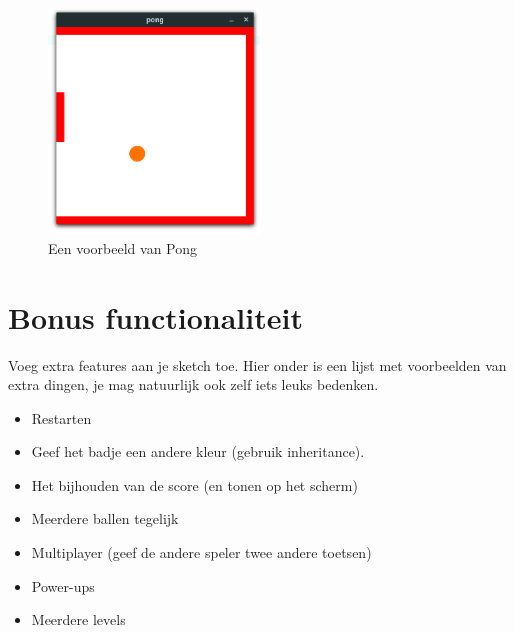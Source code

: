 \documentclass{../qh_assignment}
\begin{document}
\begin{figure}[H]
	\centering
	\includegraphics[width=0.5\textwidth]{pong.png}
	\caption{Een voorbeeld van Pong}
	\label{fig:koch}
\end{figure}

\newpage

\section{Bonus functionaliteit}
Voeg extra features aan je sketch toe. Hier onder is een lijst met voorbeelden van extra dingen, je mag natuurlijk ook zelf iets leuks bedenken.
\begin{itemize}
    \item Restarten
    \item Geef het badje een andere kleur (gebruik inheritance).
    \item Het bijhouden van de score (en tonen op het scherm)
    \item Meerdere ballen tegelijk
    \item Multiplayer (geef de andere speler twee andere toetsen)
    \item Power-ups
    \item Meerdere levels
\end{itemize}
\end{document}
